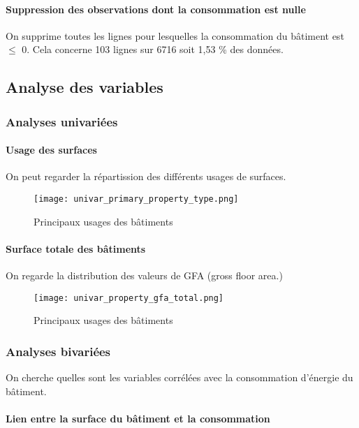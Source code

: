 \paragraph{Suppression des observations dont la consommation est nulle} On supprime toutes les lignes pour lesquelles la consommation du bâtiment est $\le$ 0. Cela concerne 103 lignes sur 6716 soit 1,53 \% des données.


\subsection{Analyse des variables}

\subsubsection{Analyses univariées}

\paragraph{Usage des surfaces} On peut regarder la répartission des différents
usages de surfaces.
\begin{figure}[H]
  \texttt{[image: univar\_primary\_property\_type.png]}
  \caption{Principaux usages des bâtiments}
  \label{}
\end{figure}

\paragraph{Surface totale des bâtiments} On regarde la distribution des valeurs
de GFA (gross floor area.)
\begin{figure}[H]
  \texttt{[image: univar\_property\_gfa\_total.png]}
  \caption{Principaux usages des bâtiments}
  \label{}
\end{figure}



\subsubsection{Analyses bivariées}

On cherche quelles sont les variables corrélées avec la consommation d'énergie
du bâtiment.

\paragraph{Lien entre la surface du bâtiment et la consommation}

